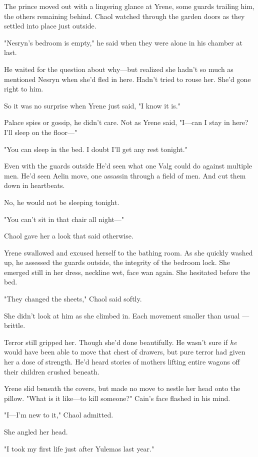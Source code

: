 The prince moved out with a lingering glance at Yrene, some guards trailing him, the others remaining behind. Chaol watched through the garden doors as they settled into place just outside.

"Nesryn's bedroom is empty," he said when they were alone in his chamber at last.

He waited for the question about why---but realized she hadn't so much as mentioned Nesryn when she'd fled in here. Hadn't tried to rouse her. She'd gone right to him.

So it was no surprise when Yrene just said, "I know it is."

Palace spies or gossip, he didn't care. Not as Yrene said, "I---can I stay in here? I'll sleep on the floor---"

"You can sleep in the bed. I doubt I'll get any rest tonight."

Even with the guards outside  He'd seen what one Valg could do against multiple men. He'd seen Aelin move, one assassin through a field of men. And cut them down in heartbeats.

No, he would not be sleeping tonight.

"You can't sit in that chair all night---"

Chaol gave her a look that said otherwise.

Yrene swallowed and excused herself to the bathing room. As she quickly washed up, he assessed the guards outside, the integrity of the bedroom lock. She emerged still in her dress, neckline wet, face wan again. She hesitated before the bed.

"They changed the sheets," Chaol said softly.

She didn't look at him as she climbed in. Each movement smaller than usual ---brittle.

Terror still gripped her. Though she'd done beautifully. He wasn't sure if \emph{he} would have been able to move that chest of drawers, but pure terror had given her a dose of strength. He'd heard stories of mothers lifting entire wagons off their children crushed beneath.

Yrene slid beneath the covers, but made no move to nestle her head onto the pillow. "What is it like---to kill someone?" Cain's face flashed in his mind.

"I---I'm new to it," Chaol admitted.

She angled her head.

"I took my first life  just after Yulemas last year."

